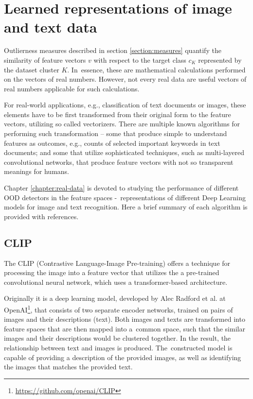 \section{Learned representations of image and text data}
\label{section:representations}

Outlierness measures described in section \ref{section:measures} quantify the similarity of feature vectors $v$ with respect to the target class $c_K$ represented by the dataset cluster $K$. In~essence, these are mathematical calculations performed on the vectors of real numbers. However, not every real data are useful vectors of real numbers applicable for such calculations.

For real-world applications, e.g., classification of text documents or images, these elements have to be first transformed from their original form to the feature vectors, utilizing so called vectorizers. There are multiple known algorithms for performing such transformation – some that produce simple to understand features as outcomes, e.g., counts of selected important keywords in text documents; and some that utilize sophisticated techniques, such as multi-layered convolutional networks, that produce feature vectors with not so transparent meanings for humans.

Chapter \ref{chapter:real-data} is devoted to studying the performance of different OOD detectors in the feature spaces -~representations of different Deep Learning models for image and text recognition. Here a brief summary of each algorithm is provided with references.


\subsection{CLIP}
\label{section:CLIP}

The CLIP (Contrastive Language-Image Pre-training) offers a technique for processing the image into a feature vector that utilizes the a pre-trained convolutional neural network, which uses a transformer-based architecture.

Originally it is a deep learning model, developed by Alec Radford et al. \cite{Radford-2021} at OpenAI\footnote{\url{https://github.com/openai/CLIP}}, that consists of two separate encoder networks, trained on pairs of images and their descriptions (text). Both images and texts are transformed into feature spaces that are then mapped into a~common space, such that the similar images and their descriptions would be clustered together. In the result, the relationship between text and images is produced. The~constructed model is capable of providing a description of the provided images, as well as identifying the images that matches the provided text.


